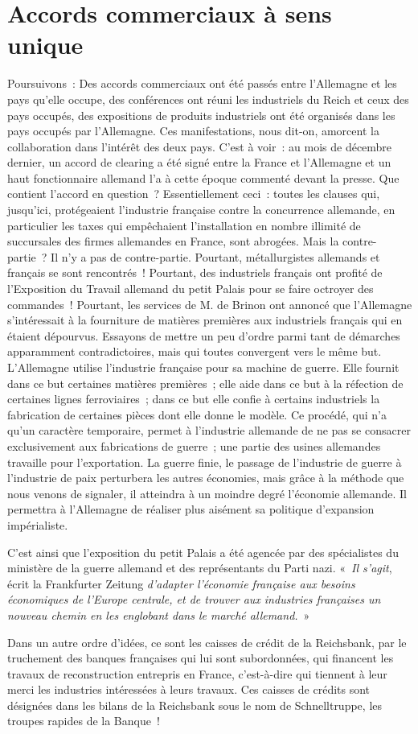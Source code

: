 \documentclass[french,twoside]{book} %
\begin{document}
\section[{Accords commerciaux à sens unique}]{Accords commerciaux à sens unique}
\noindent Poursuivons : Des accords commerciaux ont été passés entre l’Allemagne et les pays qu’elle occupe, des conférences ont réuni les industriels du Reich et ceux des pays occupés, des expositions de produits industriels ont été organisés dans les pays occupés par l’Allemagne. Ces manifestations, nous dit-on, amorcent la collaboration dans l’intérêt des deux pays. C’est à voir : au mois de décembre dernier, un accord de clearing a été signé entre la France et l’Allemagne et un haut fonctionnaire allemand l’a à cette époque commenté devant la presse. Que contient l’accord en question ? Essentiellement ceci : toutes les clauses qui, jusqu’ici, protégeaient l’industrie française contre la concurrence allemande, en particulier les taxes qui empêchaient l’installation en nombre illimité de succursales des firmes allemandes en France, sont abrogées. Mais la contre-partie ? Il n’y a pas de contre-partie. Pourtant, métallurgistes allemands et français se sont rencontrés ! Pourtant, des industriels français ont profité de l’Exposition du Travail allemand du petit Palais pour se faire octroyer des commandes ! Pourtant, les services de M. de Brinon ont annoncé que l’Allemagne s’intéressait à la fourniture de matières premières aux industriels français qui en étaient dépourvus. Essayons de mettre un peu d’ordre parmi tant de démarches apparamment contradictoires, mais qui toutes convergent vers le même but. L’Allemagne utilise l’industrie française pour sa machine de guerre. Elle fournit dans ce but certaines matières premières ; elle aide dans ce but à la réfection de certaines lignes ferroviaires ; dans ce but elle confie à certains industriels la fabrication de certaines pièces dont elle donne le modèle. Ce procédé, qui n’a qu’un caractère temporaire, permet à l’industrie allemande de ne pas se consacrer exclusivement aux fabrications de guerre ; une partie des usines allemandes travaille pour l’exportation. La guerre finie, le passage de l’industrie de guerre à l’industrie de paix perturbera les autres économies, mais grâce à la méthode que nous venons de signaler, il atteindra à un moindre degré l’économie allemande. Il permettra à l’Allemagne de réaliser plus aisément sa politique d’expansion impérialiste.\par
C’est ainsi que l’exposition du petit Palais a été agencée par des spécialistes du ministère de la guerre allemand et des représentants du Parti nazi. « \emph{Il s’agit}, écrit la Frankfurter Zeitung \emph{d’adapter l’économie française aux besoins économiques de l’Europe centrale, et de trouver aux industries françaises un nouveau chemin en les englobant dans le marché allemand.} »\par
Dans un autre ordre d’idées, ce sont les caisses de crédit de la Reichsbank, par le truchement des banques françaises qui lui sont subordonnées, qui financent les travaux de reconstruction entrepris en France, c’est-à-dire qui tiennent à leur merci les industries intéressées à leurs travaux. Ces caisses de crédits sont désignées dans les bilans de la Reichsbank sous le nom de Schnelltruppe, les troupes rapides de la Banque !
\end{document}
